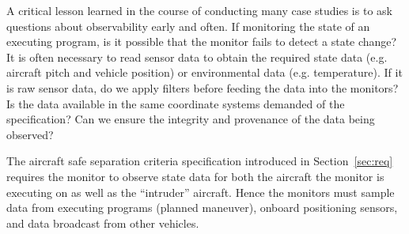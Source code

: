 A critical lesson learned in the course of conducting many case studies
is to ask questions about observability early and often. 
If monitoring the state of an executing program, is it possible that
the monitor fails to detect a state change?  It is often necessary to
read sensor data to obtain the required state data (e.g. aircraft
pitch and vehicle position) or environmental data (e.g. temperature).
If it is raw sensor data, do we apply filters before feeding the data
into the monitors?  Is the data available in the same coordinate
systems demanded of the specification?  Can we ensure the integrity
and provenance of the data being observed? 


  The aircraft safe separation criteria specification introduced in
  Section~\ref{sec:req} requires the monitor to  observe state data for
  both the aircraft the monitor is executing on as well as the
  ``intruder'' aircraft.  Hence the monitors must sample data from
  executing programs (planned maneuver), onboard positioning sensors,
  and data broadcast from other vehicles.  



